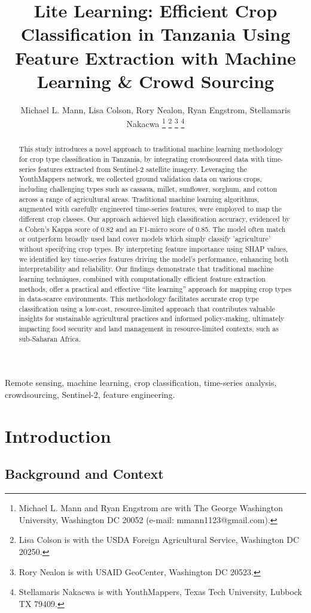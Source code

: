 \documentclass[journal]{IEEEtran}
\title{Lite Learning: Efficient Crop Classification in Tanzania Using Feature Extraction with Machine Learning \& Crowd Sourcing}
\author{
    Michael L. Mann, 
    Lisa Colson,
    Rory Nealon,
    Ryan Engstrom,
    Stellamaris Nakacwa
    \thanks{Michael L. Mann and Ryan Engstrom are with The George Washington University, Washington DC 20052 (e-mail: mmann1123@gmail.com).}
    \thanks{Lisa Colson is with the USDA Foreign Agricultural Service, Washington DC 20250.}
    \thanks{Rory Nealon is with USAID GeoCenter, Washington DC 20523.}
    \thanks{Stellamaris Nakacwa is with YouthMappers, Texas Tech University, Lubbock TX 79409.}
}
\begin{document}
\maketitle

\begin{abstract}
This study introduces a novel approach to traditional machine learning methodology for crop type classification in Tanzania, by integrating crowdsourced data with time-series features extracted from Sentinel-2 satellite imagery. Leveraging the YouthMappers network, we collected ground validation data on various crops, including challenging types such as cassava, millet, sunflower, sorghum, and cotton across a range of agricultural areas. Traditional machine learning algorithms, augmented with carefully engineered time-series features, were employed to map the different crop classes. Our approach achieved high classification accuracy, evidenced by a Cohen's Kappa score of 0.82 and an F1-micro score of 0.85. The model often match or outperform broadly used land cover models which simply classify 'agriculture' without specifying crop types. By interpreting feature importance using SHAP values, we identified key time-series features driving the model's performance, enhancing both interpretability and reliability. Our findings demonstrate that traditional machine learning techniques, combined with computationally efficient feature extraction methods, offer a practical and effective “lite learning” approach for mapping crop types in data-scarce environments. This methodology facilitates accurate crop type classification using a low-cost, resource-limited approach that contributes valuable insights for sustainable agricultural practices and informed policy-making, ultimately impacting food security and land management in resource-limited contexts, such as sub-Saharan Africa.
\end{abstract}

\begin{IEEEkeywords}
Remote sensing, machine learning, crop classification, time-series analysis, crowdsourcing, Sentinel-2, feature engineering.
\end{IEEEkeywords}

\section{Introduction}
\subsection{Background and Context}
\end{document}
